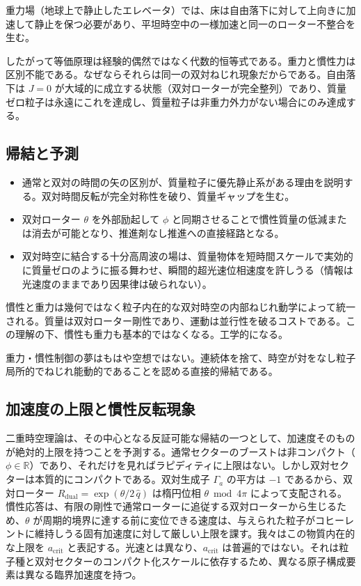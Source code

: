 \documentclass[dvipdfmx,a4paper]{article}
\begin{document}
重力場（地球上で静止したエレベータ）では、床は自由落下に対して上向きに加速して静止を保つ必要があり、平坦時空中の一様加速と同一のローター不整合を生む。

したがって等価原理は経験的偶然ではなく代数的恒等式である。重力と慣性力は区別不能である。なぜならそれらは同一の双対ねじれ現象だからである。自由落下は $J = 0$ が大域的に成立する状態（双対ローターが完全整列）であり、質量ゼロ粒子は永遠にこれを達成し、質量粒子は非重力外力がない場合にのみ達成する。

\subsection{帰結と予測}

\begin{itemize}
\item 通常と双対の時間の矢の区別が、質量粒子に優先静止系がある理由を説明する。双対時間反転が完全対称性を破り、質量ギャップを生む。
\item 双対ローター $\theta$ を外部励起して $\phi$ と同期させることで慣性質量の低減または消去が可能となり、推進剤なし推進への直接経路となる。
\item 双対時空に結合する十分高周波の場は、質量物体を短時間スケールで実効的に質量ゼロのように振る舞わせ、瞬間的超光速位相速度を許しうる（情報は光速度のままであり因果律は破られない）。
\end{itemize}

慣性と重力は幾何ではなく粒子内在的な双対時空の内部ねじれ動学によって統一される。質量は双対ローター剛性であり、運動は並行性を破るコストである。この理解の下、慣性も重力も基本的ではなくなる。工学的になる。

重力・慣性制御の夢はもはや空想ではない。連続体を捨て、時空が対をなし粒子局所的でねじれ能動的であることを認める直接的帰結である。

\subsection{加速度の上限と慣性反転現象}
\label{subsec:acceleration-limit}

二重時空理論は、その中心となる反証可能な帰結の一つとして、加速度そのものが絶対的上限を持つことを予測する。通常セクターのブーストは非コンパクト（$\phi \in \mathbb{R}$）であり、それだけを見ればラピディティに上限はない。しかし双対セクターは本質的にコンパクトである。双対生成子 $\Gamma_a$ の平方は $-1$ であるから、双対ローター $R_\text{dual} = \exp(\theta/2 \, \hat q)$ は楕円位相 $\theta \bmod 4\pi$ によって支配される。慣性応答は、有限の剛性で通常ローターに追従する双対ローターから生じるため、$\theta$ が周期的境界に達する前に変位できる速度は、与えられた粒子がコヒーレントに維持しうる固有加速度に対して厳しい上限を課す。我々はこの物質内在的な上限を $a_\text{crit}$ と表記する。光速とは異なり、$a_\text{crit}$ は普遍的ではない。それは粒子種と双対セクターのコンパクト化スケールに依存するため、異なる原子構成要素は異なる臨界加速度を持つ。
\end{document}
